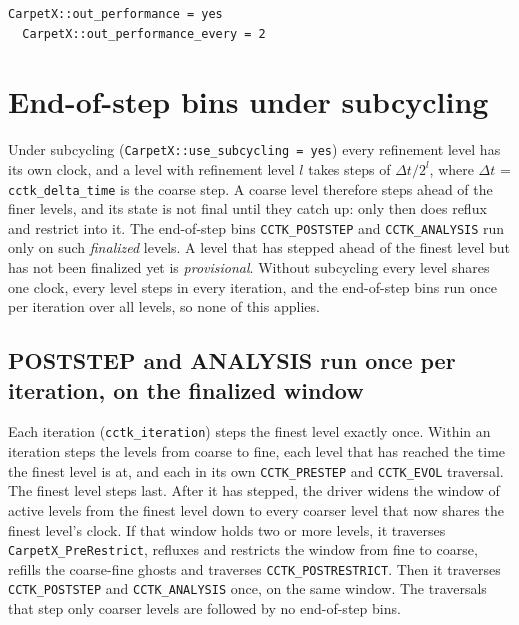 \begin{lstlisting}[language=bash]
  CarpetX::out_performance = yes  
  CarpetX::out_performance_every = 2
\end{lstlisting}

\section{End-of-step bins under subcycling}
\label{sec:end_of_step_subcycling}

Under subcycling (\texttt{CarpetX::use\_subcycling = yes}) every refinement level has its own clock, and a level with refinement level $l$ takes steps of $\Delta t/2^l$, where $\Delta t$ = \texttt{cctk\_delta\_time} is the coarse step. A coarse level therefore steps ahead of the finer levels, and its state is not final until they catch up: only then does \CarpetX\space reflux and restrict into it. The end-of-step bins \texttt{CCTK\_POSTSTEP} and \texttt{CCTK\_ANALYSIS} run only on such \emph{finalized} levels. A level that has stepped ahead of the finest level but has not been finalized yet is \emph{provisional}. Without subcycling every level shares one clock, every level steps in every iteration, and the end-of-step bins run once per iteration over all levels, so none of this applies.

\subsection{POSTSTEP and ANALYSIS run once per iteration, on the finalized window}

Each iteration (\texttt{cctk\_iteration}) steps the finest level exactly once. Within an iteration \CarpetX\space steps the levels from coarse to fine, each level that has reached the time the finest level is at, and each in its own \texttt{CCTK\_PRESTEP} and \texttt{CCTK\_EVOL} traversal. The finest level steps last. After it has stepped, the driver widens the window of active levels from the finest level down to every coarser level that now shares the finest level's clock. If that window holds two or more levels, it traverses \texttt{CarpetX\_PreRestrict}, refluxes and restricts the window from fine to coarse, refills the coarse-fine ghosts and traverses \texttt{CCTK\_POSTRESTRICT}. Then it traverses \texttt{CCTK\_POSTSTEP} and \texttt{CCTK\_ANALYSIS} once, on the same window. The traversals that step only coarser levels are followed by no end-of-step bins.

